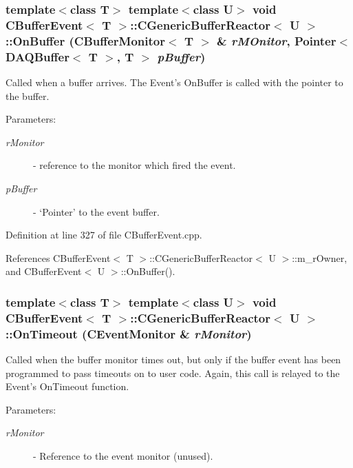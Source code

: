 \subsubsection{\setlength{\rightskip}{0pt plus 5cm}template$<$class T$>$ template$<$class U$>$ void {\bf CBuffer\-Event}$<$ T $>$::CGeneric\-Buffer\-Reactor$<$ U $>$::On\-Buffer ({\bf CBuffer\-Monitor}$<$ T $>$ \& {\em r\-MOnitor}, Pointer$<$ DAQBuffer$<$ T $>$, T $>$ {\em p\-Buffer})\hspace{0.3cm}{\tt  [virtual]}}\label{classCBufferEvent_1_1CGenericBufferReactor_a1}


Called when a buffer arrives. The Event's On\-Buffer is called with the pointer to the buffer.\begin{Desc}
\item[Parameters: ]\par
\begin{description}
\item[{\em 
r\-Monitor}]- reference to the monitor which fired the event. \item[{\em 
p\-Buffer}]- `Pointer' to the event buffer. \end{description}
\end{Desc}


Definition at line 327 of file CBuffer\-Event.cpp.

References CBuffer\-Event$<$ T $>$::CGeneric\-Buffer\-Reactor$<$ U $>$::m\_\-r\-Owner, and CBuffer\-Event$<$ U $>$::On\-Buffer().
\subsubsection{\setlength{\rightskip}{0pt plus 5cm}template$<$class T$>$ template$<$class U$>$ void {\bf CBuffer\-Event}$<$ T $>$::CGeneric\-Buffer\-Reactor$<$ U $>$::On\-Timeout ({\bf CEvent\-Monitor} \& {\em r\-Monitor})\hspace{0.3cm}{\tt  [virtual]}}\label{classCBufferEvent_1_1CGenericBufferReactor_a2}


Called when the buffer monitor times out, but only if the buffer event has been programmed to pass timeouts on to user code. Again, this call is relayed to the Event's On\-Timeout function. \begin{Desc}
\item[Parameters: ]\par
\begin{description}
\item[{\em 
r\-Monitor}]- Reference to the event monitor (unused). \end{description}
\end{Desc}


